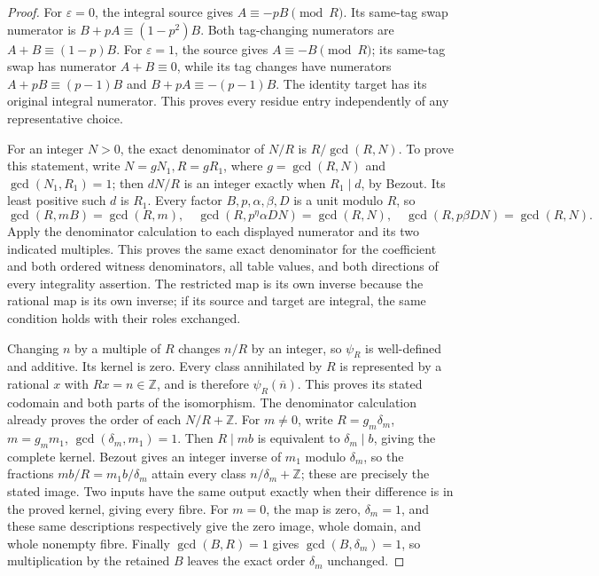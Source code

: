 \begin{proof}
For \(\varepsilon=0\), the integral source gives
\(A\equiv-pB\pmod R\). Its same-tag swap numerator is
\(B+pA\equiv(1-p^2)B\). Both tag-changing numerators are
\(A+B\equiv(1-p)B\). For \(\varepsilon=1\), the source
gives \(A\equiv-B\pmod R\); its same-tag swap has numerator
\(A+B\equiv0\), while its tag changes have numerators
\(A+pB\equiv(p-1)B\) and
\(B+pA\equiv-(p-1)B\). The identity target has its original
integral numerator. This proves every residue entry independently
of any representative choice.

For an integer \(N>0\), the exact denominator of \(N/R\)
is \(R/\gcd(R,N)\). To prove this statement, write
\(N=gN_1,R=gR_1\), where \(g=\gcd(R,N)\) and
\(\gcd(N_1,R_1)=1\); then \(dN/R\) is an integer exactly
when \(R_1\mid d\), by Bezout. Its least positive such \(d\)
is \(R_1\). Every factor \(B,p,\alpha,\beta,D\) is a
unit modulo \(R\), so
\[
 \gcd(R,mB)=\gcd(R,m),\quad
 \gcd(R,p^\eta\alpha DN)=\gcd(R,N),\quad
 \gcd(R,p\beta DN)=\gcd(R,N).
\]
Apply the denominator calculation to each displayed numerator and
its two indicated multiples. This proves the same exact denominator
for the coefficient and both ordered witness denominators, all table
values, and both directions of every integrality assertion.
The restricted map is its own inverse because the rational map is
its own inverse; if its source and target are integral, the same
condition holds with their roles exchanged.

Changing \(n\) by a multiple of \(R\) changes \(n/R\) by
an integer, so \(\psi_R\) is well-defined and additive. Its
kernel is zero. Every class annihilated by \(R\) is represented
by a rational \(x\) with \(Rx=n\in\mathbb Z\), and is
therefore \(\psi_R(\overline n)\). This proves its stated
codomain and both parts of the isomorphism. The denominator
calculation already proves the order of each \(N/R+\mathbb Z\).
For \(m\ne0\), write \(R=g_m\delta_m\),
\(m=g_mm_1\), \(\gcd(\delta_m,m_1)=1\).
Then \(R\mid mb\) is equivalent to \(\delta_m\mid b\),
giving the complete kernel. Bezout gives an integer inverse of
\(m_1\) modulo \(\delta_m\), so the fractions
\(mb/R=m_1b/\delta_m\) attain every class
\(n/\delta_m+\mathbb Z\); these are precisely the stated
image. Two inputs have the same output exactly when their
difference is in the proved kernel, giving every fibre. For
\(m=0\), the map is zero, \(\delta_m=1\), and these same
descriptions respectively give the zero image, whole domain, and
whole nonempty fibre. Finally \(\gcd(B,R)=1\) gives
\(\gcd(B,\delta_m)=1\), so multiplication by the retained
\(B\) leaves the exact order \(\delta_m\) unchanged.
\end{proof}

